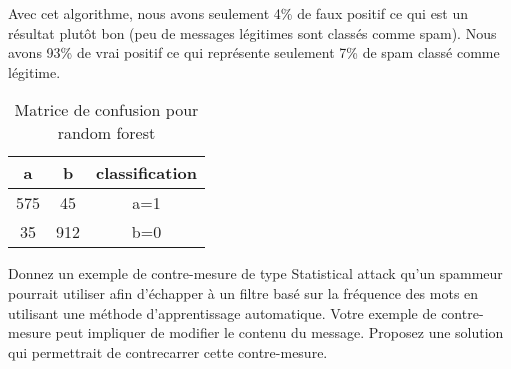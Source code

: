 \begin{homeworkProblem}
\begin{homeworkSection}{3.3}
{			Avec cet algorithme, nous avons seulement 4\% de faux positif ce qui est un résultat plutôt bon (peu de messages légitimes sont classés comme spam).
			Nous avons 93\% de vrai positif ce qui représente seulement 7\% de spam classé comme légitime.
						
			
			}
			\begin{table}
			\centering
			\begin{tabular}{|c|c||c|}
			
			\hline 
			a & b & classification \\ 
			\hline 
			575 & 45 & a=1 \\ 
			\hline 
			35 & 912 & b=0 \\ 
			\hline 
			\end{tabular} 
			\caption{Matrice de confusion pour random forest}
			\label{tab:confMat33}			
			\end{table}						
		\end{homeworkSection}
		
		\begin{homeworkSection}{3.4}

			Donnez un exemple de contre-mesure de type Statistical attack qu'un spammeur
			pourrait utiliser afin d'échapper à un filtre basé sur la fréquence des mots en utilisant une
			méthode d'apprentissage automatique. Votre exemple de contre-mesure peut impliquer de
			modifier le contenu du message. Proposez une solution qui permettrait de contrecarrer
			cette contre-mesure.\\

			
		\end{homeworkSection}
		
			
	\end{homeworkProblem}